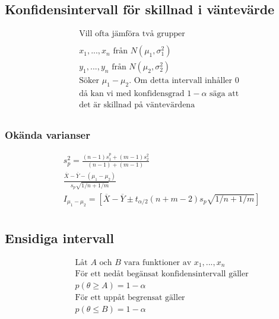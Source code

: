 \begin{multicols}{2}
\subsection{Konfidensintervall för skillnad i väntevärde }
\begin{align*}
  &\quad  \text{Vill ofta jämföra två grupper}  \\
  &\quad  \\
  &\quad  x_1,...,x_n \text{ från } N(\mu_1,\sigma^2_1) \\
  &\quad  y_1,...,y_n \text{ från } N(\mu_2,\sigma^2_2) \\
  &\quad  \text{Söker $\mu_1-\mu_2$. Om detta intervall inhåller $0$ } \\
  &\quad  \text{då kan vi med konfidensgrad $1-\alpha$ säga att}  \\
  &\quad  \text{det är skillnad på väntevärdena}  \\
\end{align*}

\subsubsection{Okända varianser}
\begin{align*}
  &\quad  s_p^2 = \frac{(n-1)s_1^p+(m-1)s_2^2}{(n-1)+(m-1)} \\
  &\quad  \frac{\overline{X}-\overline{Y}-(\mu_1-\mu_2)}{s_p\sqrt{1/n+1/m}} \\
  &\quad  I_{\mu_1-\mu_2} = [\overline{X}-\overline{Y}\pm t_{\alpha/2}(n+m-2)s_p\sqrt{1/n+1/m}] \\
\end{align*}

\subsection{Ensidiga intervall}
\begin{align*}
  &\quad  \text{Låt $A$ och $B$ vara funktioner av }  x_1,...,x_n \\
  &\quad  \text{För ett nedåt begänsat konfidensintervall gäller} \\
  &\quad  p(\theta\geq{A})=1-\alpha \\
  &\quad  \text{För ett uppåt begrensat gäller} \\
  &\quad  p(\theta\leq{B})=1-\alpha \\
\end{align*}


\end{multicols}
